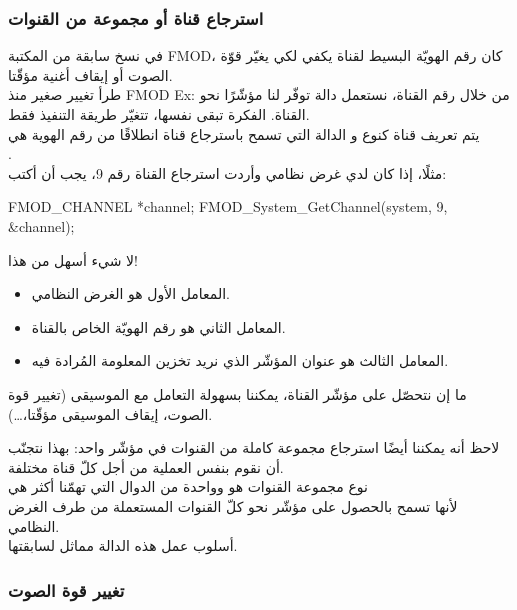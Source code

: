 \subsubsection{استرجاع قناة أو مجموعة من القنوات}

في نسخ سابقة من المكتبة
\textenglish{FMOD}،
كان رقم الهويّة البسيط لقناة يكفي لكي يغيّر قوّة الصوت أو إيقاف أغنية مؤقّتا.\\
طرأ تغيير صغير منذ
\textenglish{FMOD Ex}:
من خلال رقم القناة، نستعمل دالة توفّر لنا مؤشّرًا نحو القناة. الفكرة تبقى نفسها، تتغيّر طريقة التنفيذ فقط.\\
يتم تعريف قناة كنوع
و الدالة التي تسمح باسترجاع قناة انطلاقًا من رقم الهوية هي\\
.\\
مثلًا، إذا كان لدي غرض نظامي وأردت استرجاع القناة رقم 9، يجب أن أكتب:

\begin{Csource}
FMOD_CHANNEL *channel;
FMOD_System_GetChannel(system, 9, &channel);
\end{Csource}

لا شيء أسهل من هذا!

\begin{itemize}
	\item المعامل الأول هو الغرض النظامي.
	\item المعامل الثاني هو رقم الهويّة الخاص بالقناة.
	\item المعامل الثالث هو عنوان المؤشّر الذي نريد تخزين المعلومة المُرادة فيه.
\end{itemize}

ما إن نتحصّل على مؤشّر القناة، يمكننا بسهولة التعامل مع الموسيقى (تغيير قوة الصوت، إيقاف الموسيقى مؤقّتا،\dots).

لاحظ أنه يمكننا أيضًا استرجاع مجموعة كاملة من القنوات في مؤشّر واحد: بهذا نتجنّب أن نقوم بنفس العملية من أجل كلّ قناة مختلفة.\\
نوع مجموعة القنوات هو
وواحدة من الدوال التي تهمّنا أكثر هي\\
لأنها تسمح بالحصول على مؤشّر نحو كلّ القنوات المستعملة من طرف الغرض النظامي.\\
أسلوب عمل هذه الدالة مماثل لسابقتها.

\subsubsection{تغيير قوة الصوت}

